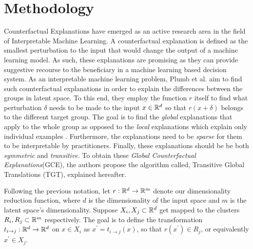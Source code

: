 \section{Methodology}
\label{sec:claims}
Counterfactual Explanations \cite{verma2020counterfactual} have emerged as an active research area in the field of Interpretable Machine Learning. A counterfactual explanation is defined as the smallest perturbation to the input that would change the output of a machine learning model. As such, these explanations are promising as they can provide suggestive recourse to the beneficiary in a machine learning based decision system.  As an interpretable machine learning problem, Plumb et al. \cite{plumb2020explaining} aim to find such counterfactual explanations in order to explain the differences between the groups in latent space. To this end, they employ the function $r$ itself to find what perturbation $\delta$ needs to be made to the input $x \in \mathbb{R}^{d}$ so that $r(x + \delta)$ belongs to the different target group. The goal is to find the \textit{global} explanations that apply to the whole group as opposed to the \textit{local} explanations which explain only individual examples \cite{carvalho2019machine}. 
Furthermore, the  explanations need to be \textit{sparse} for them to be interpretable by practitioners.
Finally, these explanations should be be both \textit{symmetric} and \textit{transitive}. To obtain these \textit{Global Counterfactual Explanations}(GCE), the authors propose the algorithm called, Transitive Global Translations (TGT), explained hereafter.

Following the previous notation, let $r : \mathbb{R}^d \rightarrow \mathbb{R}^m$ denote our dimensionality reduction function, where $d$ is the dimensionality of the input space and $m$ is the latent space's dimensionality. Suppose $X_i, X_j \subset \mathbb{R}^d$ get mapped to the clusters $R_i, R_j \subset \mathbb{R}^m$ respectively. The goal is to define the transformation $t_{i \rightarrow j}: \mathbb{R}^{d} \to \mathbb{R}^{d}$ on $x \in X_{i}$ as $x^{'} = t_{i \to j}(x)$, so that $r(x^{'}) \in R_{j}$, or equivalently $x^{'} \in X_{j}$. 

